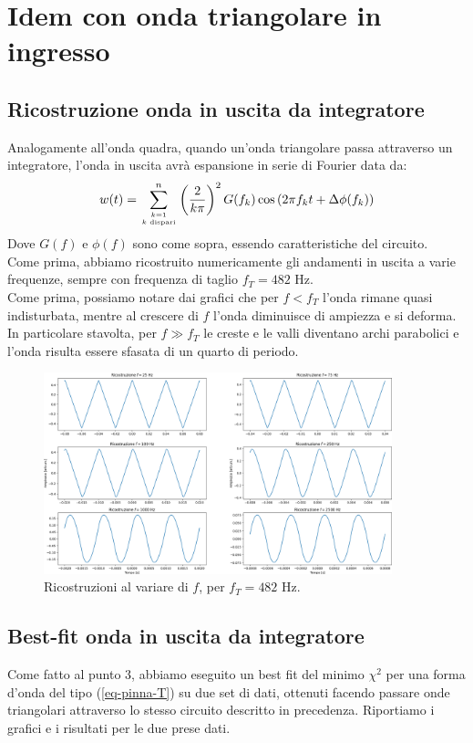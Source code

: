 \documentclass{article}[a4paper, oneside,11pt]
\begin{document}
\section{Idem con onda triangolare in ingresso}

    \subsection{Ricostruzione onda in uscita da integratore}
        Analogamente all'onda quadra, quando un'onda triangolare passa attraverso un integratore, l'onda in uscita avrà espansione in serie di Fourier data da:
        \begin{equation}\label{eq-pinna-T}
        w(t) = \sum_{{k=1}\atop{k \text{ dispari}}}^n \left(\frac{2}{k\pi}\right)^2 G(f_k) \cos\left(2\pi f_k t + \Delta\phi(f_k)\right)
        \end{equation}
        Dove $G(f)$ e $\phi(f)$ sono come sopra, essendo caratteristiche del circuito.\\
        Come prima, abbiamo ricostruito numericamente gli andamenti in uscita a varie frequenze, sempre con frequenza di taglio $f_T = 482$ Hz.\\
        Come prima, possiamo notare dai grafici che per $f<f_T$ l'onda rimane quasi indisturbata, mentre al crescere di $f$ l'onda diminuisce di ampiezza e si deforma. In particolare stavolta, per $f\gg f_T$ le creste e le valli diventano archi parabolici e l'onda risulta essere sfasata di un quarto di periodo.
    
    \begin{figure}[H]
        \centering
        \includegraphics[width=0.9\textwidth]{img/Ricostruzione_pinna-T.png}
        \caption{Ricostruzioni al variare di $f$, per $f_T = 482$ Hz.}
    \end{figure}
    
    \subsection{Best-fit onda in uscita da integratore}
        Come fatto al punto 3, abbiamo eseguito un best fit del minimo $\chi^2$ per una forma d'onda del tipo (\ref{eq-pinna-T}) su due set di dati, ottenuti facendo passare onde triangolari attraverso lo stesso circuito descritto in precedenza. Riportiamo i grafici e i risultati per le due prese dati.
    
\end{document}
